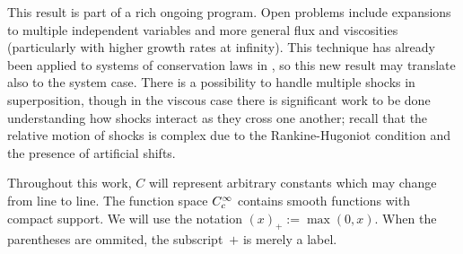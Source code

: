 This result is part of a rich ongoing program.  Open problems include expansions to multiple independent variables and more general flux and viscosities (particularly with higher growth rates at infinity).  This technique has already been applied to systems of conservation laws in \cite{KaVa.navier}, so this new result may translate also to the system case.  There is a possibility to handle multiple shocks in superposition, though in the viscous case there is significant work to be done understanding how shocks interact as they cross one another; recall that the relative motion of shocks is complex due to the Rankine-Hugoniot condition and the presence of artificial shifts.  




Throughout this work, $C$ will represent arbitrary constants which may change from line to line.  The function space $C_c^\infty$ contains smooth functions with compact support.  We will use the notation $(x)_+ := \max(0,x)$.  When the parentheses are ommited, the subscript~$+$ is merely a label. 
